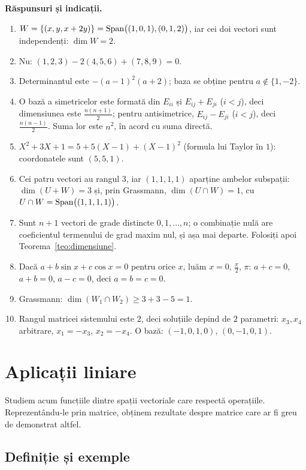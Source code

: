 \medskip\noindent\textbf{Răspunsuri și indicații.}
\begin{enumerate}[label=\textbf{\arabic*.},leftmargin=*]
\item $W=\{(x,y,x+2y)\}=\operatorname{Span}\bigl((1,0,1),(0,1,2)\bigr)$, iar cei doi vectori sunt independenți: $\dim W=2$.
\item Nu: $(1,2,3)-2(4,5,6)+(7,8,9)=0$.
\item Determinantul este $-(a-1)^2(a+2)$; baza se obține pentru $a\notin\{1,-2\}$.
\item O bază a simetricelor este formată din $E_{ii}$ și $E_{ij}+E_{ji}$ ($i<j$), deci dimensiunea este $\frac{n(n+1)}2$; pentru antisimetrice, $E_{ij}-E_{ji}$ ($i<j$), deci $\frac{n(n-1)}2$. Suma lor este $n^2$, în acord cu suma directă.
\item $X^2+3X+1=5+5(X-1)+(X-1)^2$ (formula lui Taylor în $1$): coordonatele sunt $(5,5,1)$.
\item Cei patru vectori au rangul $3$, iar $(1,1,1,1)$ aparține ambelor subspații: $\dim(U+W)=3$ și, prin Grassmann, $\dim(U\cap W)=1$, cu $U\cap W=\operatorname{Span}\bigl((1,1,1,1)\bigr)$.
\item Sunt $n+1$ vectori de grade distincte $0,1,\dots,n$; o combinație nulă are coeficientul termenului de grad maxim nul, și așa mai departe. Folosiți apoi Teorema~\ref{teo:dimensiune}.
\item Dacă $a+b\sin x+c\cos x=0$ pentru orice $x$, luăm $x=0$, $\frac\pi2$, $\pi$: $a+c=0$, $a+b=0$, $a-c=0$, deci $a=b=c=0$.
\item Grassmann: $\dim(W_1\cap W_2)\ge3+3-5=1$.
\item Rangul matricei sistemului este $2$, deci soluțiile depind de $2$ parametri: $x_3,x_4$ arbitrare, $x_1=-x_3$, $x_2=-x_4$. O bază: $(-1,0,1,0)$, $(0,-1,0,1)$.
\end{enumerate}

\chapter{Aplicații liniare}\label{ch:aplicatii}

Studiem acum funcțiile dintre spații vectoriale care respectă operațiile. Reprezentându-le prin matrice, obținem rezultate despre matrice care ar fi greu de demonstrat altfel.

\section{Definiție și exemple}

